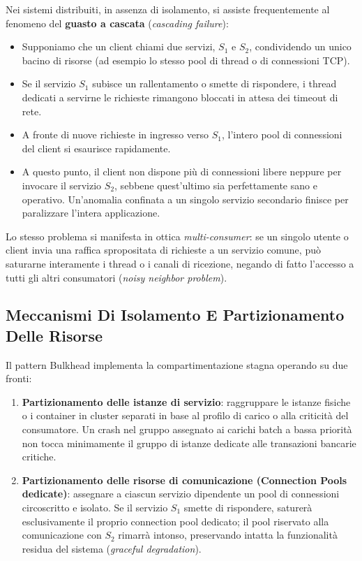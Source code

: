 \documentclass[11pt, a4paper]{article}
\begin{document}
Nei sistemi distribuiti, in assenza di isolamento, si assiste frequentemente al fenomeno del \textbf{guasto a cascata} (\emph{cascading failure}):
\begin{itemize}[noitemsep]
    \item Supponiamo che un client chiami due servizi, $S_1$ e $S_2$, condividendo un unico bacino di risorse (ad esempio lo stesso pool di thread o di connessioni TCP).
    \item Se il servizio $S_1$ subisce un rallentamento o smette di rispondere, i thread dedicati a servirne le richieste rimangono bloccati in attesa dei timeout di rete.
    \item A fronte di nuove richieste in ingresso verso $S_1$, l'intero pool di connessioni del client si esaurisce rapidamente.
    \item A questo punto, il client non dispone più di connessioni libere neppure per invocare il servizio $S_2$, sebbene quest'ultimo sia perfettamente sano e operativo. Un'anomalia confinata a un singolo servizio secondario finisce per paralizzare l'intera applicazione.
\end{itemize}

Lo stesso problema si manifesta in ottica \emph{multi-consumer}: se un singolo utente o client invia una raffica spropositata di richieste a un servizio comune, può saturarne interamente i thread o i canali di ricezione, negando di fatto l'accesso a tutti gli altri consumatori (\emph{noisy neighbor problem}).

\subsection{Meccanismi Di Isolamento E Partizionamento Delle Risorse}

Il pattern Bulkhead implementa la compartimentazione stagna operando su due fronti:

\begin{enumerate}
    \item \textbf{Partizionamento delle istanze di servizio}: raggruppare le istanze fisiche o i container in cluster separati in base al profilo di carico o alla criticità del consumatore. Un crash nel gruppo assegnato ai carichi batch a bassa priorità non tocca minimamente il gruppo di istanze dedicate alle transazioni bancarie critiche.
    \item \textbf{Partizionamento delle risorse di comunicazione (Connection Pools dedicate)}: assegnare a ciascun servizio dipendente un pool di connessioni circoscritto e isolato. Se il servizio $S_1$ smette di rispondere, saturerà esclusivamente il proprio connection pool dedicato; il pool riservato alla comunicazione con $S_2$ rimarrà intonso, preservando intatta la funzionalità residua del sistema (\emph{graceful degradation}).
\end{enumerate}
\end{document}
